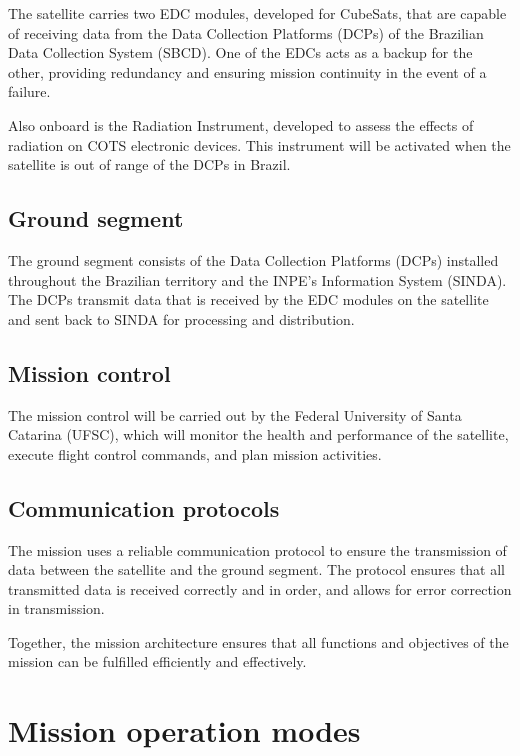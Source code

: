 The satellite carries two EDC modules, developed for CubeSats, that are capable of receiving data from the Data Collection Platforms (DCPs) of the Brazilian Data Collection System (SBCD). One of the EDCs acts as a backup for the other, providing redundancy and ensuring mission continuity in the event of a failure.

Also onboard is the Radiation Instrument, developed to assess the effects of radiation on COTS electronic devices. This instrument will be activated when the satellite is out of range of the DCPs in Brazil.

\subsection{Ground segment}

The ground segment consists of the Data Collection Platforms (DCPs) installed throughout the Brazilian territory and the INPE's Information System (SINDA). The DCPs transmit data that is received by the EDC modules on the satellite and sent back to SINDA for processing and distribution.

\subsection{Mission control}

The mission control will be carried out by the Federal University of Santa Catarina (UFSC), which will monitor the health and performance of the satellite, execute flight control commands, and plan mission activities.

\subsection{Communication protocols}

The mission uses a reliable communication protocol to ensure the transmission of data between the satellite and the ground segment. The protocol ensures that all transmitted data is received correctly and in order, and allows for error correction in transmission.

Together, the mission architecture ensures that all functions and objectives of the mission can be fulfilled efficiently and effectively.

\section{Mission operation modes}

